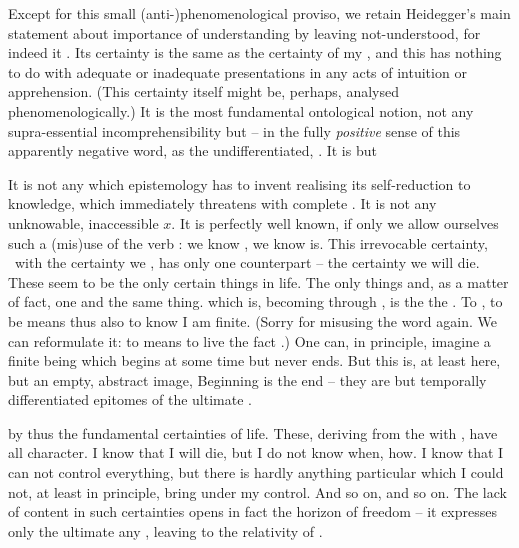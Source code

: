 Except for this small (anti-)phenomenological proviso, we retain Heidegger's
main statement about importance of understanding by leaving not-understood, for
indeed it .  Its certainty is the same as the certainty of my ,
and this has nothing to do with adequate or inadequate presentations in any acts
of intuition or apprehension. (This certainty itself might be, perhaps, analysed
phenomenologically.)  It is the most fundamental ontological notion, not any
supra-essential incomprehensibility but  -- in the fully {\em
  positive} sense of this apparently negative word, as the undifferentiated,
.  It is  but 

\pa It is not any  which epistemology has to invent
realising its self-reduction to  knowledge, which immediately
threatens with complete . It is not any unknowable,
inaccessible $x$. It is perfectly well known, if only we allow ourselves such a
(mis)use of the verb : we know , we know  is. This
irrevocable certainty, \equi\ with the certainty  we , has
only one counterpart -- the certainty  we will die.  These seem to be
the only  certain things in life. The only things and, as a matter
of fact, one and the same thing.  which is, becoming 
through , is the  the . To
, to be  means thus also to know  I am finite.
(Sorry for misusing the word  again. We can reformulate it: to
 means to live the fact .) One can, in
principle, imagine a finite being which begins at some time but never ends. But
this is, at least here, but an empty, abstract image,  Beginning is the end -- they are but temporally
differentiated
epitomes %
of the ultimate .

 by   thus the fundamental certainties of
life. These, 
deriving from the  with , have all
 character. I know that I will die, but I do not know when, how. I
know that I can not control everything, but there is hardly anything particular
which I could not, at least in principle, bring under my control. And so on, and
so on.  The lack of  content in such certainties opens in fact the
horizon of  freedom -- it expresses only the ultimate 
 any , leaving  to the  relativity of
.


